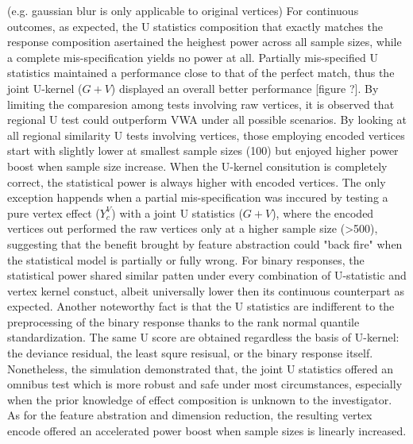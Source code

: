 \documentclass[twocolumn]{article}
\begin{document}
 (e.g. gaussian blur is only applicable to original vertices)         
For continuous outcomes, as expected, the U statistics composition that exactly matches the response composition asertained the heighest power across all sample sizes, while a complete mis-specification yields no power at all. Partially mis-specified U statistics maintained a performance close to that of the perfect match, thus the joint U-kernel ($G+V$) displayed an overall better performance [figure ?]. By limiting the comparesion among tests involving raw vertices, it is observed that regional U test could outperform VWA under all possible scenarios. By looking at all regional similarity U tests involving vertices, those employing encoded vertices start with slightly lower at smallest sample sizes (100) but enjoyed higher power boost when sample size increase. When the U-kernel consitution is completely correct, the statistical power is always higher with encoded vertices. The only exception happends when a partial mis-specification was inccured by testing a pure vertex effect ($Y^V_c$) with a joint U statistics ($G+V$), where the encoded vertices out performed the raw vertices only at a higher sample size (>500), suggesting that the benefit brought by feature abstraction could "back fire" when the statistical model is partially or fully wrong.
For binary responses, the statistical power shared similar patten under every combination of U-statistic and vertex kernel constuct, albeit universally lower then its continuous counterpart as expected. Another noteworthy fact is that the U statistics are indifferent to the preprocessing of the binary response thanks to the rank normal quantile standardization. The same U score are obtained regardless the basis of U-kernel: the deviance residual, the least squre resisual, or  the binary response itself.
Nonetheless, the simulation demonstrated that, the joint U statistics offered an omnibus test which is more robust and safe under most circumstances, especially when the prior knowledge of effect composition is unknown to the investigator. As for the feature abstration and dimension reduction, the resulting vertex encode offered an accelerated power boost when sample sizes is linearly increased.
\end{document}
